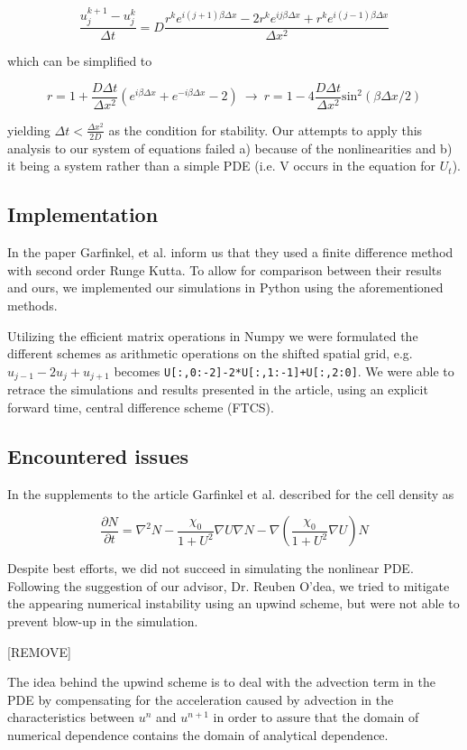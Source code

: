 \documentclass[12pt]{article}
\begin{document}
$$\frac{u_j^{k+1}-u_j^k}{\Delta t} = D\frac{r^ke^{i(j+1)\beta \Delta x}-2r^ke^{ij\beta \Delta x}+r^ke^{i(j-1)\beta \Delta x}}{\Delta x^2}$$

\medskip
which can be simplified to
\smallskip

$$r=1+\frac{D \Delta t}{\Delta x^2}(e^{i\beta \Delta x}+e^{-i\beta \Delta x}-2)\ \to\ r=1-4\frac{D \Delta t}{\Delta x^2} \mathrm{sin}^2(\beta\Delta x/2)$$
\smallskip

yielding $\Delta t < \frac{\Delta x^2}{2D}$ as the condition for stability. Our attempts to apply this analysis to our system of equations failed a) because of the nonlinearities and b) it being a system rather than a simple PDE (i.e. V occurs in the equation for $U_t$).

\subsection{Implementation}

In the paper Garfinkel, et al. inform us that they used a finite difference method with second order Runge Kutta. To allow for comparison between their results and ours, we implemented our simulations in Python using the aforementioned methods.

Utilizing the efficient matrix operations in Numpy we were formulated the different schemes as arithmetic operations on the shifted spatial grid, e.g. $u_{j-1}-2u_j+u_{j+1}$ becomes \texttt{U[:,0:-2]-2*U[:,1:-1]+U[:,2:0]}. We were able to retrace the simulations and results presented in the article, using an explicit forward time, central difference scheme (FTCS).

\subsection{Encountered issues}

In the supplements to the article Garfinkel et al. described for the cell density as

$$\frac{\partial N}{\partial t}=\nabla^2N-\frac{\chi_0}{1+U^2}\nabla U \nabla N- \nabla(\frac{\chi_0}{1+U^2}\nabla U)N$$

Despite best efforts, we did not succeed in simulating the nonlinear PDE. Following the suggestion of our advisor, Dr. Reuben O'dea, we tried to mitigate the appearing numerical instability using an upwind scheme, but were not able to prevent blow-up in the simulation.

[REMOVE]

The idea behind the upwind scheme is to deal with the advection term in the PDE by compensating for the acceleration caused by advection in the characteristics between $u^n$ and $u^{n+1}$ in order to assure that the domain of numerical dependence contains the domain of analytical dependence.
\end{document}
